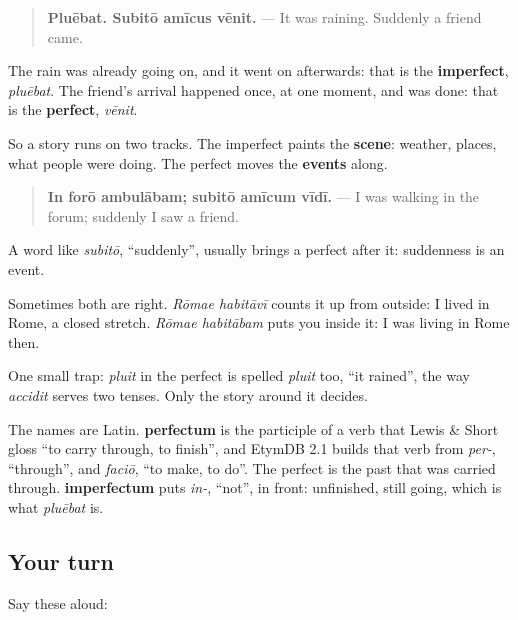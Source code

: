 \begin{grammarlens}[title={Grammar Lens: which past for which job}]
\begin{quote}
\textbf{Pluēbat. Subitō amīcus vēnit.} — It was raining. Suddenly a friend came.
\end{quote}

The rain was already going on, and it went on afterwards: that is the \textbf{imperfect}, \emph{pluēbat}. The friend's arrival happened once, at one moment, and was done: that is the \textbf{perfect}, \emph{vēnit}.

So a story runs on two tracks. The imperfect paints the \textbf{scene}: weather, places, what people were doing. The perfect moves the \textbf{events} along.

\begin{quote}
\textbf{In forō ambulābam; subitō amīcum vīdī.} — I was walking in the forum; suddenly I saw a friend.
\end{quote}

A word like \emph{subitō}, \textquotedblleft{}suddenly\textquotedblright{}, usually brings a perfect after it: suddenness is an event.
\end{grammarlens}

\begin{culture}
Sometimes both are right. \emph{Rōmae habitāvī} counts it up from outside: I lived in Rome, a closed stretch. \emph{Rōmae habitābam} puts you inside it: I was living in Rome then.

One small trap: \emph{pluit} in the perfect is spelled \emph{pluit} too, \textquotedblleft{}it rained\textquotedblright{}, the way \emph{accidit} serves two tenses. Only the story around it decides.
\end{culture}

\begin{cousinweb}
The names are Latin. \textbf{perfectum} is the participle of a verb that Lewis \& Short gloss \textquotedblleft{}to carry through, to finish\textquotedblright{}, and EtymDB 2.1 builds that verb from \emph{per-}, \textquotedblleft{}through\textquotedblright{}, and \emph{faciō}, \textquotedblleft{}to make, to do\textquotedblright{}. The perfect is the past that was carried through. \textbf{imperfectum} puts \emph{in-}, \textquotedblleft{}not\textquotedblright{}, in front: unfinished, still going, which is what \emph{pluēbat} is.
\end{cousinweb}

\subsection*{Your turn}
Say these aloud:

